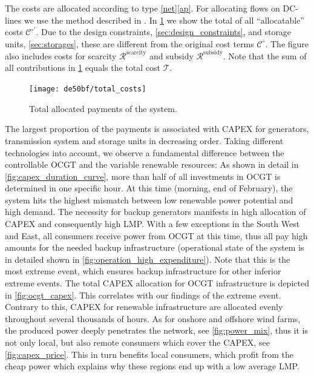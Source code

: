 \documentclass[11pt,twocolumn]{article}
\newcommand{\totalcost}{\mathcal{T}}
\newcommand{\cost}[1][\circ]{\mathcal{C}^{#1}}
\newcommand{\remainingcost}{\mathcal{R}}
\newcommand{\scarcitycost}{\remainingcost^\text{scarcity}}
\newcommand{\subsidycost}{\remainingcost^\text{subsidy}}
\begin{document}
The costs are allocated according to type \ref{net}\ref{ap}. For allocating flows on  DC-lines we use the method described in \cite{hofmann_flow_2020-1}.
In \cref{fig:total_cost} we show the total of all ``allocatable'' costs $\cost[\circ ']$. Due to the design constraints, \cref{sec:design_constraints}, and storage units, \cref{sec:storages}, these are different from the original cost terms $\cost$. The figure also includes costs for scarcity $\scarcitycost$ and subsidy  $\subsidycost$. Note that the sum of all contributions in \cref{fig:total_cost} equals the total cost $\totalcost$.  

\begin{figure}
    \centering
    \texttt{[image: de50bf/total\_costs]}
    \caption{Total allocated payments of the system. }
    \label{fig:total_cost}
\end{figure}


The largest proportion of the payments is associated with CAPEX for generators, transmission system and storage units in decreasing order. 
Taking different technologies into account, we observe a fundamental difference between the controllable OCGT  and the variable renewable resources: As shown in detail in \cref{fig:capex_duration_curve}, more than half of all investments in OCGT is determined in one specific hour. At this time (morning, end of February), the system hits the highest mismatch between low renewable power potential and high demand. The necessity for backup generators manifests in high allocation of CAPEX and consequently high LMP. With a few exceptions in the South West and East, all consumers receive power from OCGT at this time, thus all pay high amounts for the needed backup infrastructure (operational state of the system is in detailed shown in \cref{fig:operation_high_expenditure}). Note that this is the most extreme event, which ensures backup infrastructure for other inferior extreme events. The total CAPEX allocation for OCGT infrastructure is depicted in \cref{fig:ocgt_capex}. This  correlates with our findings of the extreme event. \\
Contrary to this, CAPEX for renewable infrastructure are allocated evenly throughout several thousands of hours. As for onshore and offshore wind farms, the produced power deeply penetrates the network, see \cref{fig:power_mix}, thus it is not only local, but also remote consumers which cover the CAPEX, see \cref{fig:capex_price}. This in turn benefits local consumers, which profit from the cheap power which explains why these regions end up with a low average LMP.\\
\end{document}
